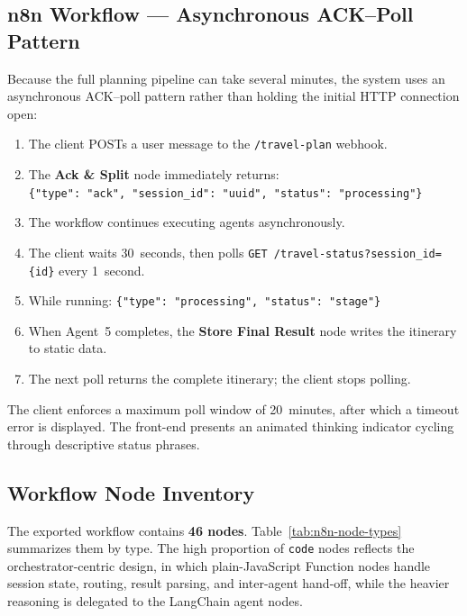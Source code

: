 \documentclass[12pt,a4paper]{report}
\begin{document}
\begin{appendices}
\chapter{n8n Workflow — Asynchronous ACK--Poll Pattern}
\label{app:n8n-nodes}

Because the full planning pipeline can take several minutes, the system uses an asynchronous
ACK--poll pattern rather than holding the initial HTTP connection open:

\begin{enumerate}
    \item The client POSTs a user message to the \texttt{/travel-plan} webhook.
    \item The \textbf{Ack \& Split} node immediately returns:\\
          \texttt{\{"type": "ack", "session\_id": "\textlangle uuid\textrangle", "status": "processing"\}}
    \item The workflow continues executing agents asynchronously.
    \item The client waits 30~seconds, then polls \texttt{GET /travel-status?session\_id=\{id\}}
          every 1~second.
    \item While running: \texttt{\{"type": "processing", "status": "\textlangle stage\textrangle"\}}
    \item When Agent~5 completes, the \textbf{Store Final Result} node writes the itinerary to
          static data.
    \item The next poll returns the complete itinerary; the client stops polling.
\end{enumerate}

The client enforces a maximum poll window of 20~minutes, after which a timeout error is displayed.
The front-end presents an animated thinking indicator cycling through descriptive status phrases.

\section{Workflow Node Inventory}
\label{app:n8n-inventory}

The exported workflow contains \textbf{46 nodes}. Table~\ref{tab:n8n-node-types} summarizes them by
type. The high proportion of \texttt{code} nodes reflects the orchestrator-centric design, in which
plain-JavaScript Function nodes handle session state, routing, result parsing, and inter-agent
hand-off, while the heavier reasoning is delegated to the LangChain agent nodes.


\end{appendices}
\end{document}
